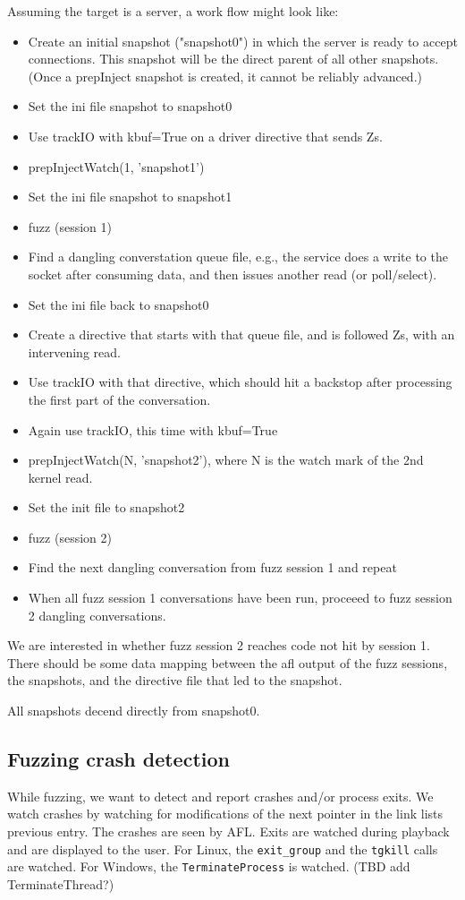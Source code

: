 \documentclass[titlepage]{article}
\begin{document}
\begin{appendices}
Assuming the target is a server, a work flow might look like:
\begin{itemize}
\item Create an initial snapshot ("snapshot0") in which the server is ready to accept connections.  This snapshot
will be the direct parent of all other snapshots. (Once a prepInject snapshot is created, it cannot be reliably
advanced.)
\item Set the ini file snapshot to snapshot0
\item Use trackIO with kbuf=True on a driver directive that sends Zs.
\item prepInjectWatch(1, 'snapshot1')
\item Set the ini file snapshot to snapshot1
\item fuzz (session 1)
\item Find a dangling converstation queue file, e.g., the service does a write to the socket after consuming data, and then issues another read (or poll/select).
\item Set the ini file back to snapshot0
\item Create a directive that starts with that queue file, and is followed Zs, with an intervening read.
\item Use trackIO with that directive, which should hit a backstop after processing the first part of the conversation.
\item Again use trackIO, this time with kbuf=True
\item prepInjectWatch(N, 'snapshot2'), where N is the watch mark of the 2nd kernel read.
\item Set the init file to snapshot2
\item fuzz (session 2)
\item Find the next dangling conversation from fuzz session 1 and repeat
\item When all fuzz session 1 conversations have been run, proceeed to fuzz session 2 dangling conversations.
\end{itemize}

We are interested in whether fuzz session 2 reaches code not hit by session 1.
There should be some data mapping between the afl output of the fuzz sessions, the snapshots,
and the directive file that led to the snapshot.

All snapshots decend directly from snapshot0.

\subsection{Fuzzing crash detection}
While fuzzing, we want to detect and report crashes and/or process exits.
We watch crashes by watching for modifications of the next pointer in the link lists previous entry.
The crashes are seen by AFL.
Exits are watched during playback and are displayed to the user.  For Linux, the {\tt exit\_group} and the
{\tt tgkill} calls are watched.  For Windows, the {\tt TerminateProcess} is watched.  (TBD add TerminateThread?)


\end{appendices}
\end{document}
